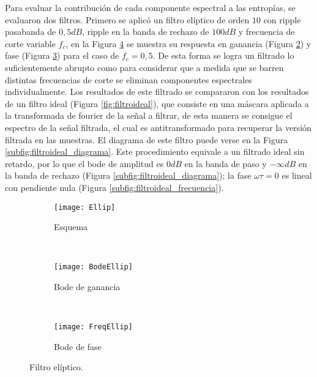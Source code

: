 Para evaluar la contribución de cada componente espectral a las entropías, se evaluaron dos filtros.
Primero se aplicó un filtro elíptico de orden $10$ con ripple pasabanda de $0,5 dB$, ripple en la banda de rechazo de $100 dB$ y frecuencia de corte variable $f_c$, en la Figura \ref{fig:filtroellip} se muestra su respuesta en ganancia (Figura \ref{subfig:filtroellip_amplitud}) y fase (Figura \ref{subfig:filtroellip_frecuencia}) para el caso de $f_c=0,5$. De esta forma se logra un filtrado lo suficientemente abrupto como para considerar que a medida que se barren distintas frecuencias de corte se eliminan componentes espectrales individualmente.
Los resultados de este filtrado se compararon con los resultados de un filtro ideal (Figura \ref{fig:filtroideal}), que consiste en una máscara aplicada a la transformada de fourier de la señal a filtrar, de esta manera se consigue el espectro de la señal filtrada, el cual es antitransformado para recuperar la versión filtrada en las muestras. El diagrama de este filtro puede verse en la Figura \ref{subfig:filtroideal_diagrama}. Este procedimiento equivale a un filtrado ideal sin retardo, por lo que el bode de amplitud es $0dB$ en la banda de paso y $-\infty dB$ en la banda de rechazo (Figura \ref{subfig:filtroideal_diagrama}); la fase $\omega\tau=0$ es lineal con pendiente nula (Figura \ref{subfig:filtroideal_frecuencia}).
%
\begin{figure}[h]
    \centering
    \begin{subfigure}[t]{.49\textwidth}
        \texttt{[image: Ellip]}
        \caption{Esquema}
        \label{subfig:filtroellip_diagrama}
    \end{subfigure}
    ~ %
    \begin{subfigure}[t]{.49\textwidth}
        \texttt{[image: BodeEllip]}
        \caption{Bode de ganancia}
        \label{subfig:filtroellip_amplitud}
    \end{subfigure}
    ~ %
    \begin{subfigure}[t]{.49\textwidth}
        \texttt{[image: FreqEllip]}
        \caption{Bode de fase}
        \label{subfig:filtroellip_frecuencia}
    \end{subfigure}
    \caption{Filtro elíptico.}\label{fig:filtroellip}
\end{figure}

